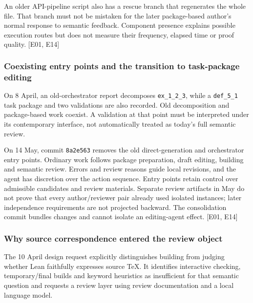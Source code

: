 An older API-pipeline script also has a rescue branch that regenerates the whole file. That branch must not be mistaken for the later package-based author's normal response to semantic feedback. Component presence explains possible execution routes but does not measure their frequency, elapsed time or proof quality. [E01, E14]

\subsubsection[Coexisting entry points and the transition to task-package editing]{\texorpdfstring{\protect\hypertarget{l1-2}{}Coexisting entry points and the transition to task-package editing}{Coexisting entry points and the transition to task-package editing}}
On 8 April, an old-orchestrator report decomposes \nolinkurl{ex_1_2_3}, while a \nolinkurl{def_5_1} task package and two validations are also recorded. Old decomposition and package-based work coexist. A validation at that point must be interpreted under its contemporary interface, not automatically treated as today's full semantic review.

On 14 May, commit \nolinkurl{8a2e563} removes the old direct-generation and orchestrator entry points. Ordinary work follows package preparation, draft editing, building and semantic review. Errors and review reasons guide local revisions, and the agent has discretion over the action sequence. Entry points retain control over admissible candidates and review materials. Separate review artifacts in May do not prove that every author/reviewer pair already used isolated instances; later independence requirements are not projected backward. The consolidation commit bundles changes and cannot isolate an editing-agent effect. [E01, E14]

\subsubsection[Why source correspondence entered the review object]{\texorpdfstring{\protect\hypertarget{l1-3}{}Why source correspondence entered the review object}{Why source correspondence entered the review object}}
The 10 April design request explicitly distinguishes building from judging whether Lean faithfully expresses source TeX. It identifies interactive checking, temporary/final builds and keyword heuristics as insufficient for that semantic question and requests a review layer using review documentation and a local language model.

